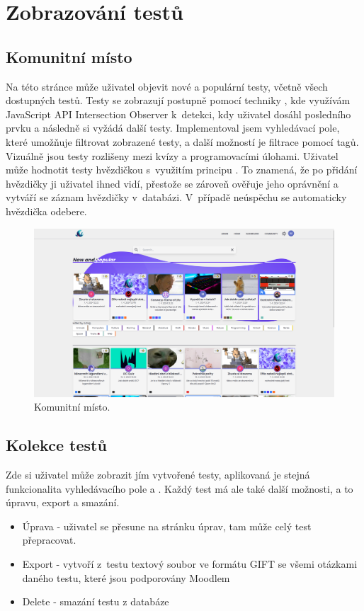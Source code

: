 \documentclass[12pt, a4paper,
openright
]{report}
\begin{document}
\clearpage
\section{Zobrazování testů}

\subsection{Komunitní místo}
\label{subsec:community}
Na této stránce může uživatel objevit nové a populární testy, včetně všech dostupných testů. Testy se zobrazují postupně pomocí techniky , kde využívám JavaScript API Intersection Observer k~detekci, kdy uživatel dosáhl posledního prvku a následně si vyžádá další testy. Implementoval jsem vyhledávací pole, které umožňuje filtrovat zobrazené testy, a další možností je filtrace pomocí tagů. Vizuálně jsou testy rozlišeny mezi kvízy a programovacími úlohami. Uživatel může hodnotit testy hvězdičkou s~využitím principu . To znamená, že po přidání hvězdičky ji uživatel ihned vidí, přestože se zároveň ověřuje jeho oprávnění a vytváří se záznam hvězdičky v~databázi. V~případě neúspěchu se automaticky hvězdička odebere.

\begin{figure}[H]
	\centering %
	\includegraphics[width=1\linewidth]{image/community.png} 
	\caption{Komunitní místo.} %
	\label{fig:community} %
\end{figure}


\subsection{Kolekce testů}
\label{subsec:collection}
Zde si uživatel může zobrazit jím vytvořené testy, aplikovaná je stejná funkcionalita vyhledávacího pole a . Každý test má ale také další možnosti, a to úpravu, export a smazání.
\begin{itemize}
	\item Úprava - uživatel se přesune na stránku úprav, tam může celý test přepracovat.
	\item Export - vytvoří z~testu textový soubor ve formátu GIFT se všemi otázkami daného testu, které jsou podporovány Moodlem
	\item Delete - smazání testu z databáze
\end{itemize}
\end{document}
